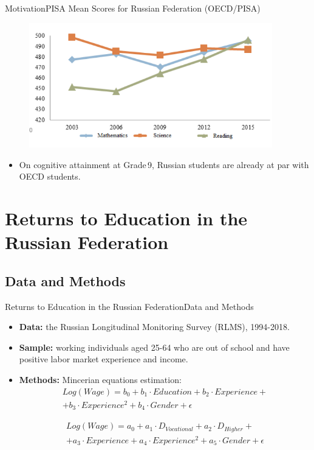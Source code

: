 \documentclass{beamer}
\begin{document}
\begin{frame}{Motivation}{PISA Mean Scores for Russian Federation (OECD/PISA)}
\begin{figure}
	\centering
	\includegraphics[width=300pt]{graph_1d.png}
\end{figure}
\begin{itemize}
	\item On cognitive attainment at Grade\,9, Russian students are already at par with OECD students.
\end{itemize}
\end{frame}

\section{Returns to Education in the Russian Federation}
\subsection{Data and Methods}
\begin{frame}{Returns to Education in the Russian Federation}{Data and Methods}
	\begin{itemize}
		\item \textbf{Data:} the Russian Longitudinal Monitoring Survey (RLMS), 1994-2018.
		\item \textbf{Sample:} working individuals aged 25-64 who are out of school and have positive labor market experience and income.
		\item \textbf{Methods:} Mincerian equations estimation:
		\begin{multline}
		Log(Wage) = b_0 + b_1\cdot Education + b_2\cdot Experience + \\
		+ b_3\cdot Experience^2 + b_4\cdot Gender + \epsilon
		\end{multline}
		
		\begin{multline}\label{eq:1.2} 
		Log(Wage) = a_0 + a_1\cdot D_{Vocational} + a_2\cdot D_{Higher} + \\
		+ a_3\cdot Experience + a_4\cdot Experience^2 + a_5\cdot Gender + \epsilon
		\end{multline}
	\end{itemize}
\end{frame}
\end{document}
